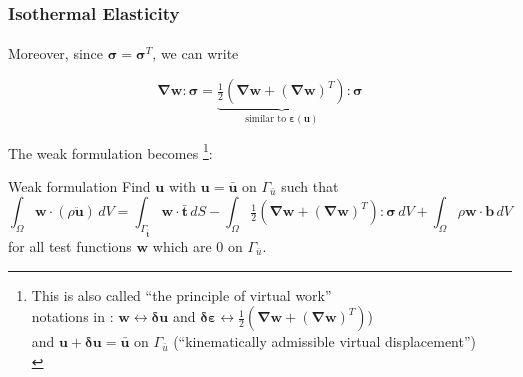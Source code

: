 \documentclass[10pt,xcolor=pdftex,dvipsnames,table]{beamer}
\begin{document}
\begin{frame}
	\frametitle{ Isothermal Elasticity }
	\framesubtitle{  }
	
	Moreover, since $\boldsymbol{\sigma} = \boldsymbol{\sigma}^T$, we can write
	
	\begin{equation*}
		\boldsymbol{\nabla}\boldsymbol{w} : \boldsymbol{\sigma} = \underbrace{\tfrac{1}{2} \left( \boldsymbol{\nabla}\boldsymbol{w} + (\boldsymbol{\nabla}\boldsymbol{w})^T \right)}_{\text{similar to } \boldsymbol{\varepsilon}(\boldsymbol{u})} : \boldsymbol{\sigma}
	\end{equation*}	
	
		
		
		
	The weak formulation becomes
	\footnote{This is also called ``the principle of virtual work'' \\
		notations in \cite{ponthot2020}: $\boldsymbol{w} \leftrightarrow \boldsymbol{\delta u}$ and $\boldsymbol{\delta \varepsilon} \leftrightarrow \tfrac{1}{2} \left( \boldsymbol{\nabla}\boldsymbol{w} + (\boldsymbol{\nabla}\boldsymbol{w})^T \right)$) \\
		and $\boldsymbol{u}+\boldsymbol{\delta u}=\boldsymbol{\bar{u}}$ on $\Gamma_{\bar{u}}$ (``kinematically admissible virtual displacement'')\\}:

	\begin{block}{Weak formulation}
		Find $\boldsymbol{u}$ with $\boldsymbol{u} = \bar{\boldsymbol{u}}$ on $\Gamma_{\bar{u}}$   such that
		\begin{equation*}
			\int_{\Omega} \boldsymbol{w}\cdot \left( \rho \ddot{\boldsymbol{u}} \right)\, dV 
			 = 
			 \int_{\Gamma_{\bar{\boldsymbol{t}}}} \boldsymbol{w}\cdot \boldsymbol{\bar{t}}\, dS
			- \int_{\Omega} \tfrac{1}{2} \left( \boldsymbol{\nabla}\boldsymbol{w} + (\boldsymbol{\nabla}\boldsymbol{w})^T \right) : \boldsymbol{\sigma}\, dV		
			+ \int_{\Omega} \rho\boldsymbol{w} \cdot \boldsymbol{b}\, dV
		\end{equation*}	
		for all test functions $\boldsymbol{w}$ which are 0 on $\Gamma_{\bar{u}}$.
	\end{block}
	
\end{frame}
\end{document}
